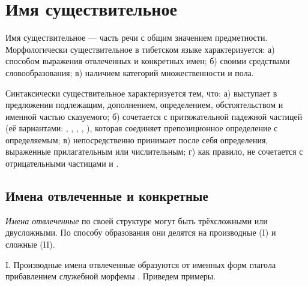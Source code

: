 \section{Имя существительное}

Имя существительное --- часть речи с общим значением предметности. Морфологически существительное в тибетском языке характеризуется: а) способом выражения отвлеченных и конкретных имен; б) своими средствами словообразования; в) наличием категорий множественности и пола.

Синтаксически существительное характеризуется тем, что: а) выступает в предложении подлежащим, дополнением, определением, обстоятельством и именной частью сказуемого; б) сочетается с притяжательной падежной частицей (её вариантами: , , , , ), которая соединяет препозиционное определение с определяемым; в) непосредственно принимает после себя определения, выраженные прилагательным или числительным; г) как правило, не сочетается с отрицательными частицами  и .

\subsection{Имена отвлеченные и конкретные}

\emph{Имена отвлеченные} по своей структуре могут быть трёхсложными или двусложными. По способу образования они делятся на производные (I) и сложные (II).

I. Производные имена отвлеченные образуются от именных форм глагола прибавлением служебной морфемы . Приведем примеры.

